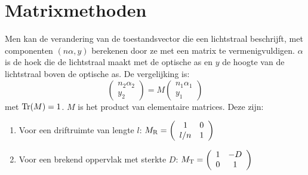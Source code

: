 \documentclass[twoside]{report}
\begin{document}
\section{Matrixmethoden}
Men kan de verandering van de toestandsvector die een lichtstraal beschrijft,
met componenten $(n\alpha,y)$ berekenen door ze met een matrix te
vermenigvuldigen. $\alpha$ is de hoek die de lichtstraal maakt met de optische
as en $y$ de hoogte van de lichtstraal boven de optische as. De vergelijking
is:
\[
\left(\begin{array}{c}n_2\alpha_2\\y_2\end{array}\right)=M
\left(\begin{array}{c}n_1\alpha_1\\y_1\end{array}\right)
\]
met ${\rm Tr}(M)=1$. $M$ is het product van elementaire matrices. Deze zijn:
\begin{enumerate}
\item Voor een driftruimte van lengte $l$: $\displaystyle M_{\rm R}=
      \left(\begin{array}{cc}1&0\\l/n&1\end{array}\right)$
\item Voor een brekend oppervlak met sterkte $D$: $\displaystyle M_{\rm T}=
      \left(\begin{array}{cc}1&-D\\0&1\end{array}\right)$
\end{enumerate}
\end{document}
